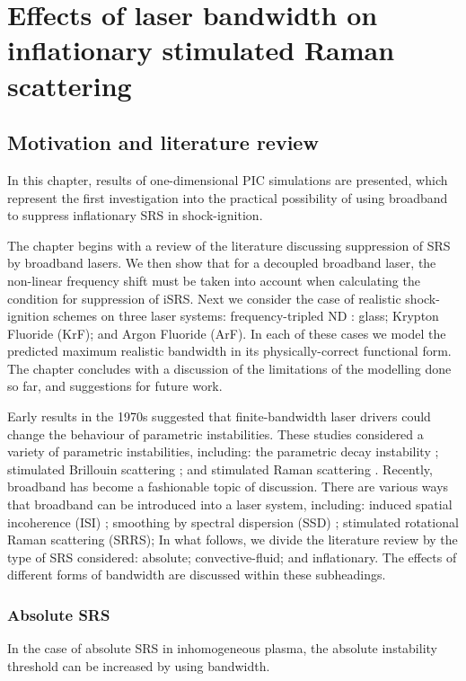 \chapter{Effects of laser bandwidth on inflationary stimulated Raman scattering}
\label{chp:broadbandSRS}

\section{Motivation and literature review}

In this chapter, results of one-dimensional PIC simulations are presented, which represent the first investigation into the practical possibility of using broadband to suppress inflationary SRS in shock-ignition.

The chapter begins with a review of the literature discussing suppression of SRS by broadband lasers. We then show that for a decoupled broadband laser, the non-linear frequency shift must be taken into account when calculating the condition for suppression of iSRS. Next we consider the case of realistic shock-ignition schemes on three laser systems: frequency-tripled ND : glass; Krypton Fluoride (KrF); and Argon Fluoride (ArF). In each of these cases we model the predicted maximum realistic bandwidth in its physically-correct functional form. The chapter concludes with a discussion of the limitations of the modelling done so far, and suggestions for future work.

Early results in the 1970s suggested that finite-bandwidth laser drivers could change the behaviour of parametric instabilities. These studies considered a variety of parametric instabilities, including: the parametric decay instability \citep{Thomson1974}; stimulated Brillouin scattering \citep{Kruer1973}; and stimulated Raman scattering \citep{raymer_theory_1979}. Recently, broadband has become a fashionable topic of discussion. There are various ways that broadband can be introduced into a laser system, including: induced spatial incoherence (\acrshort{ISI}) \citep{Lehmberg198327}; smoothing by spectral dispersion (\acrshort{SSD}) \citep{Skupsky1989}; stimulated rotational Raman scattering (SRRS);  In what follows, we divide the literature review by the type of SRS considered: absolute; convective-fluid; and inflationary. The effects of different forms of bandwidth are discussed within these subheadings.

\subsection{Absolute SRS}
In the case of absolute SRS in inhomogeneous plasma, the absolute instability threshold can be increased by using bandwidth.

